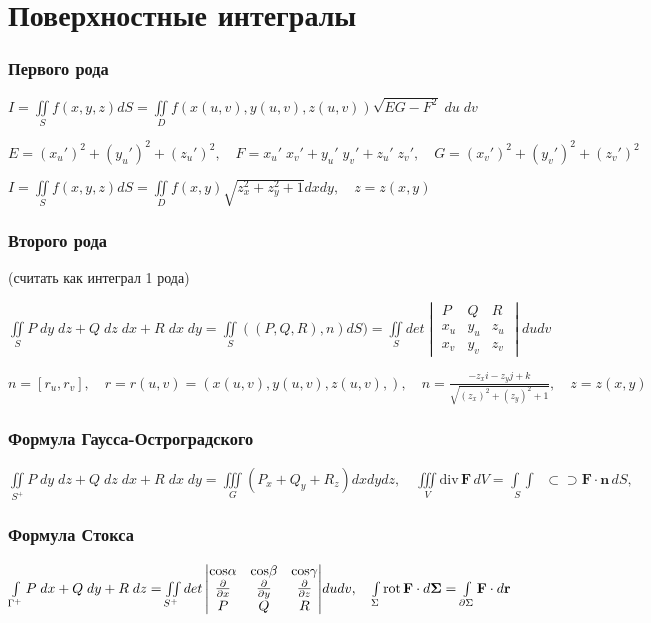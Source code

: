 \section{Поверхностные интегралы}
\subsubsection{Первого рода} 
${ I=\iint \limits _{S}{f\left(x, y, z\right)dS }=\iint \limits _{D}{f\left(x\left(u,v\right),y\left(u,v\right),z\left(u,v\right)\right){\sqrt {EG-F^{2}}}\;du\;dv}}$

${ E=\left(x_{u}'\right)^{2}+\left(y_{u}'\right)^{2}+\left(z_{u}'\right)^{2}}, \quad {F=x_{u}'\;x_{v}'+y_{u}'\;y_{v}'+z_{u}'\;z_{v}'}, \quad { G=\left(x_{v}'\right)^{2}+\left(y_{v}'\right)^{2}+\left(z_{v}'\right)^{2}}$

$ I=\iint \limits _{S}{f\left(x, y, z\right)dS } = \iint \limits _{D} f(x,y) \sqrt {z_x^2 + z_y^2 + 1}dxdy, \quad z=z(x, y) $

\subsubsection{Второго рода} 

\qquad  \qquad  \qquad \qquad \qquad \qquad \qquad \qquad \qquad (считать как интеграл 1 рода)

${\iint \limits _{S }{P\;dy\;dz+Q\;dz\;dx+R\;dx\;dy}} = {\iint \limits _{S }{((P,Q,R),n)}dS}) = \iint \limits _{S}{det \begin{vmatrix}P&Q&R\\x_u&y_u&z_u\\x_v&y_v&z_v\end{vmatrix}}dudv$


$n = [r_u, r_v], \quad r = r(u,v) = (x(u,v), y(u,v), z(u,v),) , \quad n = \frac{-z_x i-z_y j+k}{\sqrt{(z_x)^2 + (z_y)^2 + 1}}, \quad z = z(x,y)$


\subsubsection{Формула Гаусса-Остроградского}
${\iint \limits _{S^{+}}{P\;dy\;dz+Q\;dz\;dx+R\;dx\;dy}} = {\iiint \limits _{G} \left(P_x + Q_y + R_z\right)dxdydz}, \quad \iiint\limits_V\mathrm{div}\,\mathbf{F}\,dV=\int\limits_{\;\,S}\!\!\!\!\int\!\!\!\!\!\!\!\!\!\!\!\!\;\!\!\;\subset\!\!\supset\mathbf F\cdot\mathbf{n}\,dS,$

\subsubsection{Формула Стокса}
${\int \limits _{\Gamma ^{+}}{P\;dx+Q\;dy+R\;dz}} = \iint \limits _{S^{+}}{det \begin{vmatrix}\rm{cos}\alpha &\rm{cos}\beta&\rm{cos}\gamma\\ \frac {\partial}{\partial x}&\frac {\partial}{\partial y}&\frac {\partial}{\partial z}\\P&Q&R\end{vmatrix}}dudv, \quad \int \limits _{\Sigma }{\mathrm  {rot}}\,{\mathbf  {F}}\cdot d{\mathbf  {\Sigma }}=\int \limits _{{\partial \Sigma }}{\mathbf  {F}}\cdot d{\mathbf  {r}}$

